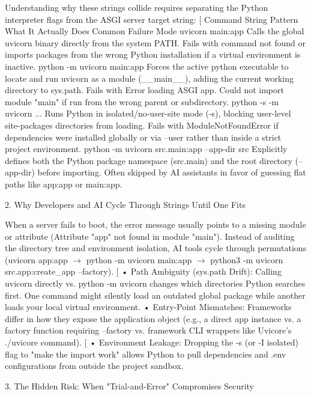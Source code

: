 Understanding why these strings collide requires separating the Python interpreter flags from the ASGI server target string: [
Command String Pattern	What It Actually Does	Common Failure Mode
uvicorn main:app	Calls the global uvicorn binary directly from the system PATH.	Fails with command not found or imports packages from the wrong Python installation if a virtual environment is inactive.
python -m uvicorn main:app	Forces the active python executable to locate and run uvicorn as a module (__main__), adding the current working directory to sys.path.	Fails with Error loading ASGI app. Could not import module "main" if run from the wrong parent or subdirectory.
python -s -m uvicorn ...	Runs Python in isolated/no-user-site mode (-s), blocking user-level site-packages directories from loading.	Fails with ModuleNotFoundError if dependencies were installed globally or via --user rather than inside a strict project environment.
python -m uvicorn src.main:app --app-dir src	Explicitly defines both the Python package namespace (src.main) and the root directory (--app-dir) before importing.	Often skipped by AI assistants in favor of guessing flat paths like app:app or main:app.


2. Why Developers and AI Cycle Through Strings Until One Fits

When a server fails to boot, the error message usually points to a missing module or attribute (Attribute "app" not found in module "main"). Instead of auditing the directory tree and environment isolation, AI tools cycle through permutations (uvicorn app:app \(\rightarrow \) python -m uvicorn main:app \(\rightarrow \) python3 -m uvicorn src.app:create_app --factory). [
• Path Ambiguity (sys.path Drift): Calling uvicorn directly vs. python -m uvicorn changes which directories Python searches first. One command might silently load an outdated global package while another loads your local virtual environment.
• Entry-Point Mismatches: Frameworks differ in how they expose the application object (e.g., a direct app instance vs. a factory function requiring --factory vs. framework CLI wrappers like Uvicore's ./uvicore command). [
• Environment Leakage: Dropping the -s (or -I isolated) flag to "make the import work" allows Python to pull dependencies and .env configurations from outside the project sandbox.

3. The Hidden Risk: When "Trial-and-Error" Compromises Security

